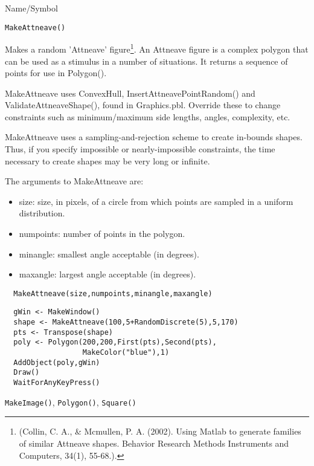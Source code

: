 \begin{desc}{Name/Symbol}
\item[Name/Symbol]	\verb+MakeAttneave()+

\item[Description] Makes a random 'Attneave' figure\footnote{(Collin, C. A., \& Mcmullen, P. A. (2002). Using Matlab to generate  families of similar Attneave shapes. Behavior Research Methods
 Instruments and Computers, 34(1), 55-68.).}. An Attneave figure is a complex polygon that can be used as a
stimulus in a number of situations.  It returns a sequence
of points for use in Polygon().

MakeAttneave uses ConvexHull,  InsertAttneavePointRandom() and
ValidateAttneaveShape(), found in Graphics.pbl.  Override these
to change constraints such as  minimum/maximum side
lengths, angles, complexity, etc.

MakeAttneave uses a sampling-and-rejection scheme to create in-bounds
shapes.  Thus, if you specify impossible or nearly-impossible
constraints, the time necessary to create shapes may be very long or
infinite.

 The arguments to MakeAttneave are:
\begin{itemize}
\item size: size, in pixels, of a circle from which points are
  sampled in a uniform distribution. 
\item numpoints: number of points in the polygon.
\item minangle: smallest angle acceptable (in degrees).
\item maxangle: largest angle acceptable  (in degrees).
\end{itemize}

\item[Usage]
\begin{verbatim}
  MakeAttneave(size,numpoints,minangle,maxangle)
\end{verbatim}

\item[Example]	
\begin{verbatim}
  gWin <- MakeWindow()
  shape <- MakeAttneave(100,5+RandomDiscrete(5),5,170)
  pts <- Transpose(shape)
  poly <- Polygon(200,200,First(pts),Second(pts),
                  MakeColor("blue"),1)
  AddObject(poly,gWin)
  Draw()
  WaitForAnyKeyPress()
\end{verbatim}
\item[See Also]	\verb+MakeImage()+, \verb+Polygon()+, \verb+Square()+
\end{desc}


